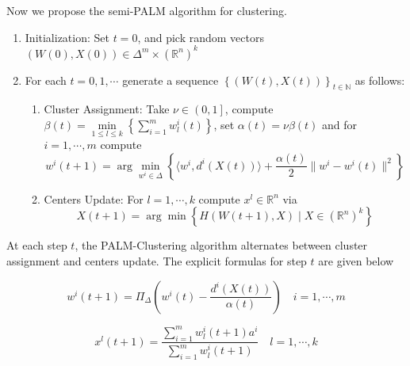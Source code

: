 \documentclass[11pt]{article}
\numberwithin{equation}{section}
\begin{document}
Now we propose the semi-PALM algorithm for clustering.
\begin{enumerate}[(1)]
	\item Initialization: Set $t=0$, and pick random vectors $(W(0),X(0)) \in \Delta^m \times (\mathbb{R}^n)^k$

	\item For each $t=0,1, \cdots$ generate a sequence $\left\lbrace(W(t),X(t))\right\rbrace_{t \in \mathbb{N}}$ as follows:
	\begin{enumerate}[(2.1)]
		\item Cluster Assignment: Take $\nu \in \left(0,1\right]$, compute $\beta(t) = \min\limits_{1 \leq l \leq k} \left\lbrace \sum\limits_{i=1}^{m} w^i_l(t)\right \rbrace$, set
		$\alpha(t)=\nu \beta(t) $ and for $i=1, \cdots ,m$ compute
		\begin{equation}
			w^i(t+1) = \arg\min\limits_{w^i \in \Delta} \left\lbrace \langle w^i , d^i(X(t)) \rangle + \frac{\alpha(t)}{2} \|w^i - w^i(t)\|^2 \right\rbrace \label{StateEq5}
		\end{equation}
		
		\item Centers Update: For $l=1, \cdots ,k$ compute $x^l \in \mathbb{R}^n$ via
		\begin{equation}
			X(t+1) = \arg\min \left\lbrace H(W(t+1), X) \mid X \in (\mathbb{R}^n)^k \right\rbrace \label{StateEq6}
		\end{equation}
	\end{enumerate}
\end{enumerate}

\newpage

At each step $t$, the PALM-Clustering algorithm alternates between cluster assignment and centers update. The explicit formulas for step $t$ are given below

\begin{equation}
w^i(t+1) = \Pi_{\Delta} \left(w^i(t) - \frac{d^i(X(t))}{\alpha(t)}\right) \quad i=1, \cdots ,m \label{StateEq7}
\end{equation}

\begin{equation}
x^l(t+1) = \frac{\sum_{i=1}^{m} w^i_l(t+1) a^i}{\sum_{i=1}^{m} w^i_l(t+1)} \quad l=1, \cdots ,k \label{StateEq8}
\end{equation}
\end{document}
